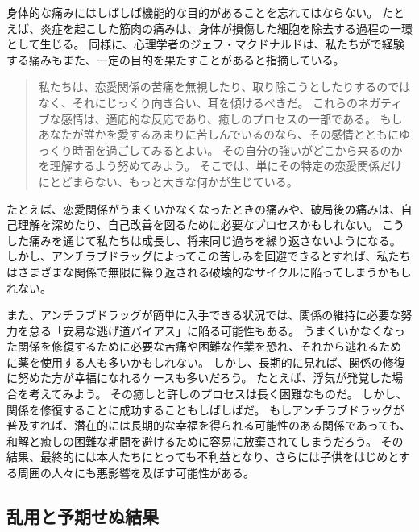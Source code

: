 \documentclass[paper=a4,book,openany]{jlreq}
\newcommand{\ig}[1]{}           %
\begin{document}
身体的な痛みにはしばしば機能的な目的があることを忘れてはならない。
たとえば、炎症を起こした筋肉の痛みは、身体が損傷した細胞を除去する過程の一環として生じる。
同様に、心理学者のジェフ・マクドナルド\ig{(Geoff MacDonald)}は、私たちがで経験する痛みもまた、一定の目的を果たすことがあると指摘している。

\begin{quote}
私たちは、恋愛関係の苦痛を無視したり、取り除こうとしたりするのではなく、それにじっくり向き合い、耳を傾けるべきだ。
これらのネガティブな感情は、適応的な反応であり、癒しのプロセスの一部である。
もしあなたが誰かを愛するあまりに苦しんでいるのなら、その感情とともにゆっくり時間を過ごしてみるとよい。
その自分の強いがどこから来るのかを理解するよう努めてみよう。
そこでは、単にその特定の恋愛関係だけにとどまらない、もっと大きな何かが生じている。
\citep{lawson17:_why_does_love_hurt_so_much}
\end{quote}

たとえば、恋愛関係がうまくいかなくなったときの痛みや、破局後の痛みは、自己理解を深めたり、自己改善を図るために必要なプロセスかもしれない。
こうした痛みを通じて私たちは成長し、将来同じ過ちを繰り返さないようになる。
しかし、アンチラブドラッグによってこの苦しみを回避できるとすれば、私たちはさまざまな関係で無限に繰り返される破壊的なサイクルに陥ってしまうかもしれない。

また、アンチラブドラッグが簡単に入手できる状況では、関係の維持に必要な努力を怠る「安易な逃げ道バイアス」に陥る可能性もある。
うまくいかなくなった関係を修復するために必要な苦痛や困難な作業を恐れ、それから逃れるために薬を使用する人も多いかもしれない。
しかし、長期的に見れば、関係の修復に努めた方が幸福になれるケースも多いだろう。
たとえば、浮気が発覚した場合を考えてみよう。
その癒しと許しのプロセスは長く困難なものだ。
しかし、関係を修復することに成功することもしばしばだ。
もしアンチラブドラッグが普及すれば、潜在的には長期的な幸福を得られる可能性のある関係であっても、和解と癒しの困難な期間を避けるために容易に放棄されてしまうだろう。
その結果、最終的には本人たちにとっても不利益となり、さらには子供をはじめとする周囲の人々にも悪影響を及ぼす可能性がある。

\subsection{乱用と予期せぬ結果}
\end{document}
